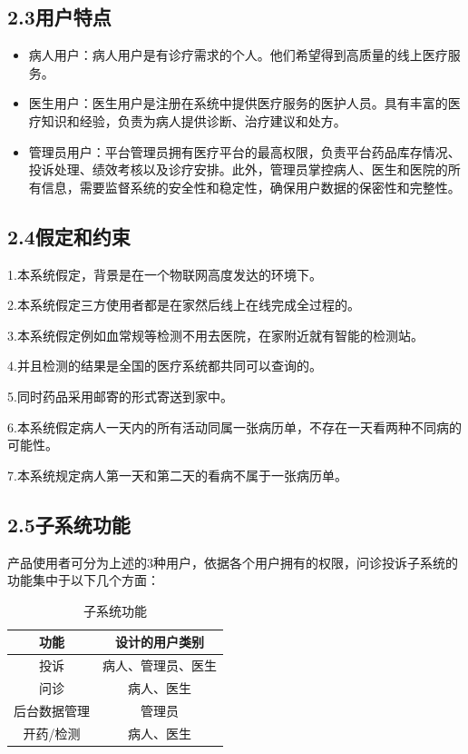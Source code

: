 \documentclass[24pt,a4paper]{article}%
\begin{document}
\subsection*{\songti 2.3用户特点}

\begin{itemize}
	\item 病人用户：病人用户是有诊疗需求的个人。他们希望得到高质量的线上医疗服务。
	\item 医生用户：医生用户是注册在系统中提供医疗服务的医护人员。具有丰富的医疗知识和经验，负责为病人提供诊断、治疗建议和处方。
	\item 管理员用户：平台管理员拥有医疗平台的最高权限，负责平台药品库存情况、投诉处理、绩效考核以及诊疗安排。此外，管理员掌控病人、医生和医院的所有信息，需要监督系统的安全性和稳定性，确保用户数据的保密性和完整性。 
\end{itemize}

\subsection*{\songti 2.4假定和约束}
1.本系统假定，背景是在一个物联网高度发达的环境下。\par
2.本系统假定三方使用者都是在家然后线上在线完成全过程的。\par
3.本系统假定例如血常规等检测不用去医院，在家附近就有智能的检测站。\par
4.并且检测的结果是全国的医疗系统都共同可以查询的。\par
5.同时药品采用邮寄的形式寄送到家中。\par
6.本系统假定病人一天内的所有活动同属一张病历单，不存在一天看两种不同病的可能性。\par
7.本系统规定病人第一天和第二天的看病不属于一张病历单。


\subsection*{\songti 2.5子系统功能}
产品使用者可分为上述的3种用户，依据各个用户拥有的权限，问诊投诉子系统的功能集中于以下几个方面：
\begin{table}[htpb]
	\centering
	\caption{子系统功能}
	\begin{tabular}{|c|c|}
		\hline
		功能 & 设计的用户类别\\ \hline
		投诉 & 病人、管理员、医生\\ \hline
		问诊 & 病人、医生\\ \hline
		后台数据管理 & 管理员\\ \hline
		开药/检测 & 病人、医生\\ \hline
	\end{tabular}
\end{table}
\end{document}
